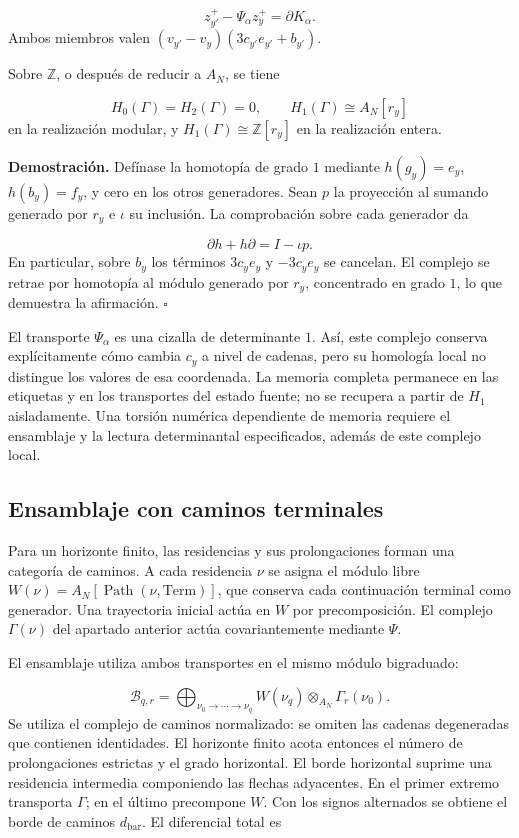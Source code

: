 \[
z^+_{y'}-\Psi_\alpha z^+_y=\partial K_\alpha.
\]
Ambos miembros valen \((v_{y'}-v_y)(3c_{y'}e_{y'}+b_{y'})\).

Sobre \(\mathbb Z\), o después de reducir a \(A_N\), se tiene

\[
H_0(\Gamma)=H_2(\Gamma)=0,
\qquad H_1(\Gamma)\cong A_N[r_y]
\]
en la realización modular, y \(H_1(\Gamma)\cong\mathbb Z[r_y]\) en la realización entera.

\textbf{Demostración.} Defínase la homotopía de grado \(1\) mediante \(h(g_y)=e_y\), \(h(b_y)=f_y\), y cero en los otros generadores. Sean \(p\) la proyección al sumando generado por \(r_y\) e \(\iota\) su inclusión. La comprobación sobre cada generador da

\[
\partial h+h\partial=I-\iota p.
\]
En particular, sobre \(b_y\) los términos \(3c_ye_y\) y \(-3c_ye_y\) se cancelan. El complejo se retrae por homotopía al módulo generado por \(r_y\), concentrado en grado \(1\), lo que demuestra la afirmación. \hfill\(\square\)

El transporte \(\Psi_\alpha\) es una cizalla de determinante \(1\). Así, este complejo conserva explícitamente cómo cambia \(c_y\) a nivel de cadenas, pero su homología local no distingue los valores de esa coordenada. La memoria completa permanece en las etiquetas y en los transportes del estado fuente; no se recupera a partir de \(H_1\) aisladamente. Una torsión numérica dependiente de memoria requiere el ensamblaje y la lectura determinantal especificados, además de este complejo local.

\subsection{Ensamblaje con caminos terminales}
Para un horizonte finito, las residencias y sus prolongaciones forman una categoría de caminos. A cada residencia \(\nu\) se asigna el módulo libre \(W(\nu)=A_N[\operatorname{Path}(\nu,\mathrm{Term})]\), que conserva cada continuación terminal como generador. Una trayectoria inicial actúa en \(W\) por precomposición. El complejo \(\Gamma(\nu)\) del apartado anterior actúa covariantemente mediante \(\Psi\).

El ensamblaje utiliza ambos transportes en el mismo módulo bigraduado:

\[
\mathcal B_{q,r}=
\bigoplus_{\nu_0\to\cdots\to\nu_q}
W(\nu_q)\otimes_{A_N}\Gamma_r(\nu_0).
\]
Se utiliza el complejo de caminos normalizado: se omiten las cadenas degeneradas que contienen identidades. El horizonte finito acota entonces el número de prolongaciones estrictas y el grado horizontal. El borde horizontal suprime una residencia intermedia componiendo las flechas adyacentes. En el primer extremo transporta \(\Gamma\); en el último precompone \(W\). Con los signos alternados se obtiene el borde de caminos \(d_{\mathrm{bar}}\). El diferencial total es

